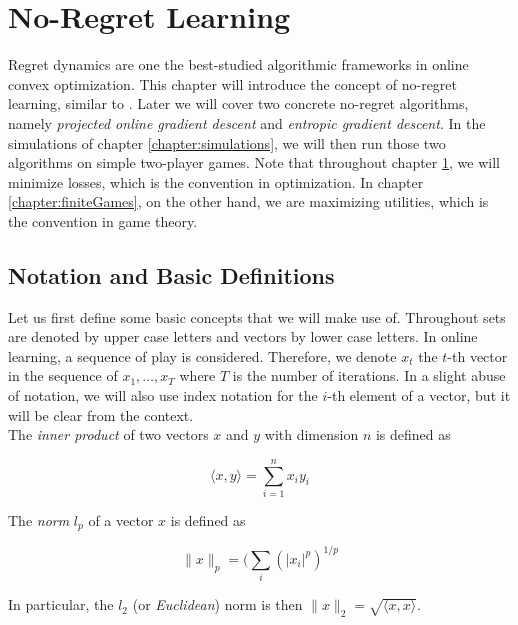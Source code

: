 
\chapter{No-Regret Learning}\label{chapter:noRegretLearning}

Regret dynamics are one the best-studied algorithmic frameworks in online convex optimization. This chapter will introduce the concept of no-regret learning, similar to \cite[Chapter 2]{HDRmertikopoulos}. Later we will cover two concrete no-regret algorithms, namely \textit{projected online gradient descent} and \textit{entropic gradient descent}. In the simulations of chapter \ref{chapter:simulations}, we will then run those two algorithms on simple two-player games. Note that throughout chapter \ref{chapter:noRegretLearning}, we will minimize losses, which is the convention in optimization. In chapter \ref{chapter:finiteGames}, on the other hand, we are maximizing utilities, which is the convention in game theory.


\section{Notation and Basic Definitions}\label{section:notationAndDefinitionsRegret}

Let us first define some basic concepts that we will make use of. Throughout sets are denoted by upper case letters and vectors by lower case letters. In online learning, a sequence of play is considered. Therefore, we denote $x_t$ the $t$-th vector in the sequence of $x_1, \dots, x_T$ where $T$ is the number of iterations. In a slight abuse of notation, we will also use index notation for the $i$-th element of a vector, but it will be clear from the context. \\

The \textit{inner product} of two vectors $x$ and $y$ with dimension $n$ is defined as 

\begin{equation*}
    \langle x,y\rangle = \sum_{i=1}^{n}x_i y_i
\end{equation*}

The \textit{norm} $l_p$ of a vector $x$ is defined as

\begin{equation*}
    \|x\|_p = (\sum_{i}(|x_i|^p)^{1/p}
\end{equation*}

In particular, the $l_2$ (or \textit{Euclidean}) norm is then $\|x\|_2 = \sqrt{\langle x,x\rangle}$. \\

